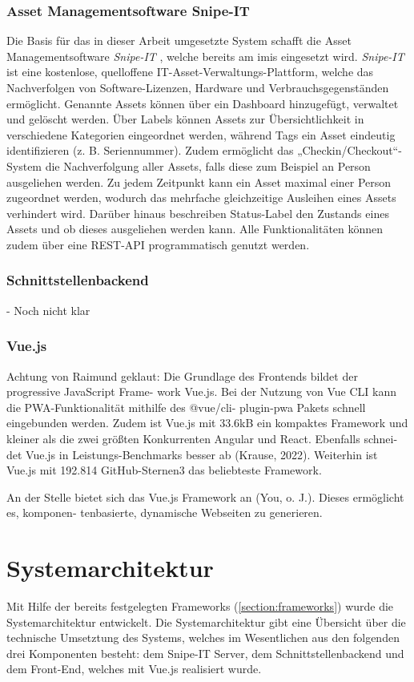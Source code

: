 \subsubsection{Asset Managementsoftware Snipe-IT}
Die Basis für das in dieser Arbeit umgesetzte System schafft die Asset
Managementsoftware \textit{Snipe-IT} \cite{noauthor_home_nodate}, welche bereits
am \ac{imis} eingesetzt wird. \textit{Snipe-IT} ist eine kostenlose, quelloffene
IT-Asset-Verwaltungs-Plattform, welche das Nachverfolgen von Software-Lizenzen,
Hardware und Verbrauchsgegenständen ermöglicht. Genannte Assets können über ein
Dashboard hinzugefügt, verwaltet und gelöscht werden. Über Labels können Assets
zur Übersichtlichkeit in verschiedene Kategorien eingeordnet werden, während
Tags ein Asset eindeutig identifizieren (z. B. Seriennummer). Zudem ermöglicht
das „Checkin/Checkout“-System die Nachverfolgung aller Assets, falls diese zum
Beispiel an Person ausgeliehen werden. Zu jedem Zeitpunkt kann ein Asset maximal
einer Person zugeordnet werden, wodurch das mehrfache gleichzeitige Ausleihen
eines Assets verhindert wird. Darüber hinaus beschreiben Status-Label den
Zustands eines Assets und ob dieses ausgeliehen werden kann. Alle
Funktionalitäten können zudem über eine REST-API programmatisch genutzt werden.

\subsubsection{Schnittstellenbackend}
- Noch nicht klar

\subsubsection{Vue.js}
Achtung von Raimund geklaut: Die Grundlage des Frontends bildet der progressive
JavaScript Frame- work Vue.js. Bei der Nutzung von Vue CLI kann die
PWA-Funktionalität mithilfe des @vue/cli- plugin-pwa Pakets schnell eingebunden
werden. Zudem ist Vue.js mit 33.6kB ein kompaktes Framework und kleiner als die
zwei größten Konkurrenten Angular und React. Ebenfalls schnei- det Vue.js in
Leistungs-Benchmarks besser ab (Krause, 2022). Weiterhin ist Vue.js mit 192.814
GitHub-Sternen3 das beliebteste Framework.

An der Stelle bietet sich das Vue.js Framework an (You, o. J.). Dieses
ermöglicht es, komponen- tenbasierte, dynamische Webseiten zu generieren.

\section{Systemarchitektur}
Mit Hilfe der bereits festgelegten Frameworks (\ref{section:frameworks}) wurde
die Systemarchitektur entwickelt. Die Systemarchitektur gibt eine Übersicht über
die technische Umsetztung des Systems, welches im Wesentlichen aus den folgenden
drei Komponenten besteht: dem Snipe-IT Server, dem Schnittstellenbackend und dem
Front-End, welches mit Vue.js realisiert wurde.

